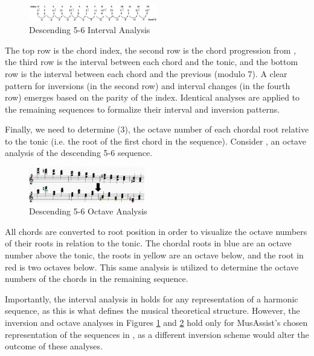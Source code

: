 \documentclass{article}
\begin{document}
\begin{figure}[h!]
\centering
\includegraphics[width=0.5\textwidth]{images/desc_56_intervals}
  \caption{Descending 5-6 Interval Analysis}\label{fig:desc_56_intervals}
\end{figure}
\vspace{-3mm}
The top row is the chord index, the second row is the chord progression from , the third row is the interval between each chord and the tonic, and the bottom row is the interval between each chord and the previous (modulo 7). A clear pattern for inversions (in the second row) and interval changes (in the fourth row) emerges based on the parity of the index. Identical analyses are applied to the remaining sequences to formalize their interval and inversion patterns.

Finally, we need to determine (3), the octave number of each chordal root relative to the tonic (i.e. the root of the first chord in the sequence). Consider , an octave analysis of the descending 5-6 sequence. 

\begin{figure}[h!]
\centering
\includegraphics[width=0.45\textwidth]{images/desc56-example}
  \caption{Descending 5-6 Octave Analysis}
  \label{fig:desc56-example}
\end{figure}

All chords are converted to root position in order to visualize the octave numbers of their roots in relation to the tonic. The chordal roots in blue are an octave number above the tonic, the roots in yellow are an octave below, and the root in red is two octaves below. This same analysis is utilized to determine the octave numbers of the chords in the remaining sequence.

Importantly, the interval analysis in  holds for any representation of a harmonic sequence, as this is what defines the musical theoretical structure. However, the inversion and octave analyses in Figures \ref{fig:desc_56_intervals} and \ref{fig:desc56-example} hold only for MusAssist's chosen representation of the sequences in , as a different inversion scheme would alter the outcome of these analyses.
\end{document}
